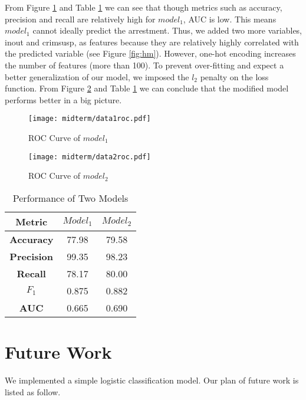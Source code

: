 \documentclass[letterpaper, twocolumn]{article}
\begin{document}
From Figure \ref{fig:d1r} and Table \ref{table:metricd1,2} we can see that though metrics such as accuracy, precision and recall are relatively high for $model_1$, AUC is low. This means $model_1$ cannot ideally predict the arrestment. Thus, we added two more variables, inout and crimsusp, as features because they are relatively highly correlated with the predicted variable (see Figure \ref{fig:hm}). %
However, one-hot encoding increases the number of features (more than 100). To prevent over-fitting and expect a better generalization of our model, we imposed the $l_2$ penalty on the loss function. From Figure \ref{fig:d2r} and Table \ref{table:metricd1,2} we can conclude that the modified model performs better in a big picture. 

\begin{figure}[htbp]
    \centering
    \texttt{[image: midterm/data1roc.pdf]}
    \caption{ROC Curve of $model_1$}
    \label{fig:d1r}
\end{figure}

\begin{figure}[htbp]
    \centering
    \texttt{[image: midterm/data2roc.pdf]}
    \caption{ROC Curve of $model_2$}
    \label{fig:d2r}
\end{figure}

\begin{table}[htbp]
    \centering
    \begin{tabular}{c|cc} \hline
    \textbf{Metric} & \textbf{$Model_1$} & \textbf{$Model_2$} \\ \hline
    \textbf{Accuracy} & 77.98 & 79.58\\ %
    \textbf{Precision} & 99.35& 98.23 \\ %
    \textbf{Recall}& 78.17 & 80.00 \\   %
    \textbf{$F_1$} & 0.875 & 0.882 \\ %
    \textbf{AUC} & 0.665 & 0.690 \\
    \hline
    \end{tabular}    
    \caption{Performance of Two Models}
    \label{table:metricd1,2}
\end{table}


\section{Future Work}
We implemented a simple logistic classification model. Our plan of future work is listed as follow.
\end{document}
